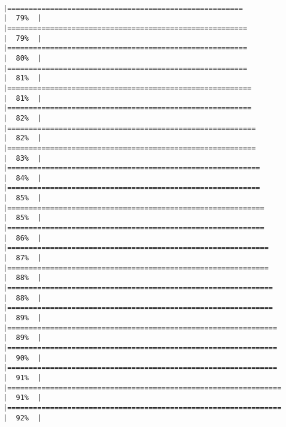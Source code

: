 \documentclass[12pt,twoside]{reedthesis}
\begin{document}
\begin{verbatim}
                                                                       |=======================================================               |  79%  |                                                                              |========================================================              |  79%  |                                                                              |========================================================              |  80%  |                                                                              |========================================================              |  81%  |                                                                              |=========================================================             |  81%  |                                                                              |=========================================================             |  82%  |                                                                              |==========================================================            |  82%  |                                                                              |==========================================================            |  83%  |                                                                              |===========================================================           |  84%  |                                                                              |===========================================================           |  85%  |                                                                              |============================================================          |  85%  |                                                                              |============================================================          |  86%  |                                                                              |=============================================================         |  87%  |                                                                              |=============================================================         |  88%  |                                                                              |==============================================================        |  88%  |                                                                              |==============================================================        |  89%  |                                                                              |===============================================================       |  89%  |                                                                              |===============================================================       |  90%  |                                                                              |===============================================================       |  91%  |                                                                              |================================================================      |  91%  |                                                                              |================================================================      |  92%  |        
\end{verbatim}
\end{document}
